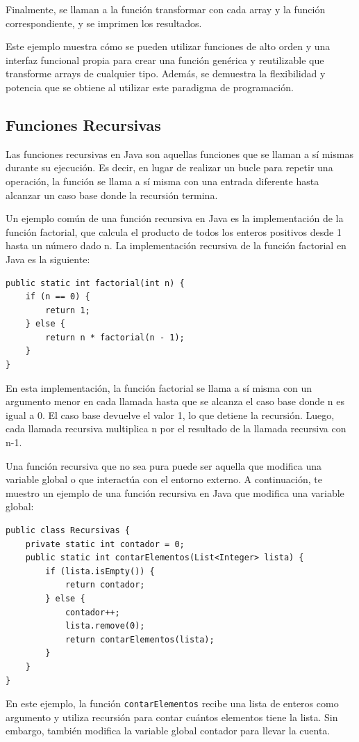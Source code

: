 \documentclass[executivepaper]{article}
\begin{document}
Finalmente, se llaman a la función transformar con cada array y la función correspondiente, y se imprimen los resultados.

Este ejemplo muestra cómo se pueden utilizar funciones de alto orden y una interfaz funcional propia para crear una función genérica y reutilizable que transforme arrays de cualquier tipo. Además, se demuestra la flexibilidad y potencia que se obtiene al utilizar este paradigma de programación.

\subsection{Funciones Recursivas}
Las funciones recursivas en Java son aquellas funciones que se llaman a sí mismas durante su ejecución. Es decir, en lugar de realizar un bucle para repetir una operación, la función se llama a sí misma con una entrada diferente hasta alcanzar un caso base donde la recursión termina.

Un ejemplo común de una función recursiva en Java es la implementación de la función factorial, que calcula el producto de todos los enteros positivos desde 1 hasta un número dado n. La implementación recursiva de la función factorial en Java es la siguiente:
\begin{lstlisting}
public static int factorial(int n) {
    if (n == 0) {
        return 1;
    } else {
        return n * factorial(n - 1);
    }
}
\end{lstlisting}
En esta implementación, la función factorial se llama a sí misma con un argumento menor en cada llamada hasta que se alcanza el caso base donde n es igual a 0. El caso base devuelve el valor 1, lo que detiene la recursión. Luego, cada llamada recursiva multiplica n por el resultado de la llamada recursiva con n-1.

Una función recursiva que no sea pura puede ser aquella que modifica una variable global o que interactúa con el entorno externo. A continuación, te muestro un ejemplo de una función recursiva en Java que modifica una variable global:
\begin{lstlisting}
public class Recursivas {
    private static int contador = 0;
    public static int contarElementos(List<Integer> lista) {
        if (lista.isEmpty()) {
            return contador;
        } else {
            contador++;
            lista.remove(0);
            return contarElementos(lista);
        }
    }
}
\end{lstlisting}
En este ejemplo, la función \lstinline{contarElementos} recibe una lista de enteros como argumento y utiliza recursión para contar cuántos elementos tiene la lista. Sin embargo, también modifica la variable global contador para llevar la cuenta.
\end{document}
